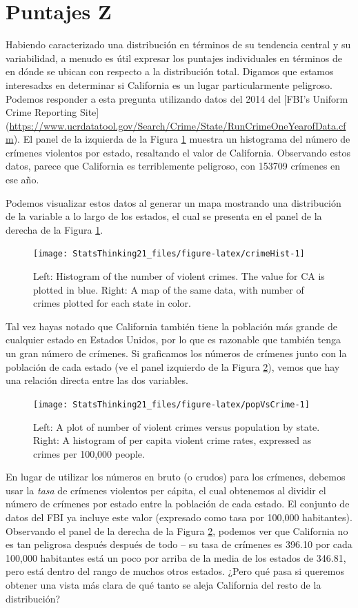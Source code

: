\documentclass[
  12pt,
]{book}
\begin{document}
\hypertarget{puntajes-z}{%
\section{Puntajes Z}\label{puntajes-z}}

Habiendo caracterizado una distribución en términos de su tendencia central y su variabilidad, a menudo es útil expresar los puntajes individuales en términos de en dónde se ubican con respecto a la distribución total. Digamos que estamos interesadxs en determinar si California es un lugar particularmente peligroso. Podemos responder a esta pregunta utilizando datos del 2014 del {[}FBI's Uniform Crime Reporting Site{]} (\url{https://www.ucrdatatool.gov/Search/Crime/State/RunCrimeOneYearofData.cfm}).
El panel de la izquierda de la Figura \ref{fig:crimeHist} muestra un histograma del número de crímenes violentos por estado, resaltando el valor de California. Observando estos datos, parece que California es terriblemente peligroso, con 153709 crímenes en ese año.

Podemos visualizar estos datos al generar un mapa mostrando una distribución de la variable a lo largo de los estados, el cual se presenta en el panel de la derecha de la Figura \ref{fig:crimeHist}.

\begin{figure}
\texttt{[image: StatsThinking21\_files/figure-latex/crimeHist-1]} \caption{Left: Histogram of the number of violent crimes.  The value for CA is plotted in blue. Right: A map of the same data, with number of crimes plotted for each state in color.}\label{fig:crimeHist}
\end{figure}

Tal vez hayas notado que California también tiene la población más grande de cualquier estado en Estados Unidos, por lo que es razonable que también tenga un gran número de crímenes. Si graficamos los números de crímenes junto con la población de cada estado (ve el panel izquierdo de la Figura \ref{fig:popVsCrime}), vemos que hay una relación directa entre las dos variables.

\begin{figure}
\texttt{[image: StatsThinking21\_files/figure-latex/popVsCrime-1]} \caption{Left: A plot of number of violent crimes versus population by state. Right: A histogram of per capita violent crime rates, expressed as crimes per 100,000 people.}\label{fig:popVsCrime}
\end{figure}

En lugar de utilizar los números en bruto (o crudos) para los crímenes, debemos usar la \emph{tasa} de crímenes violentos per cápita, el cual obtenemos al dividir el número de crímenes por estado entre la población de cada estado. El conjunto de datos del FBI ya incluye este valor (expresado como tasa por 100,000 habitantes). Observando el panel de la derecha de la Figura \ref{fig:popVsCrime}, podemos ver que California no es tan peligrosa después después de todo -- su tasa de crímenes es 396.10 por cada 100,000 habitantes está un poco por arriba de la media de los estados de 346.81, pero está dentro del rango de muchos otros estados. ¿Pero qué pasa si queremos obtener una vista más clara de qué tanto se aleja California del resto de la distribución?
\end{document}
